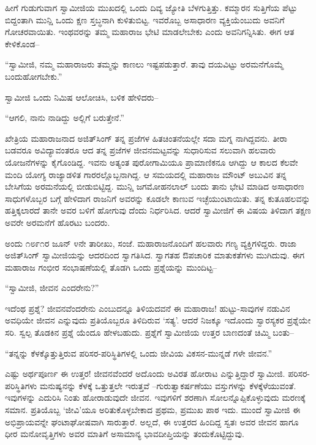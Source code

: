 ಹೀಗೆ ಗುಡುಗುವಾಗ ಸ್ವಾಮೀಜಿಯ ಮುಖದಲ್ಲಿ ಒಂದು ದಿವ್ಯ ಜ್ಯೋತಿ ಬೆಳಗುತ್ತಿತ್ತು. ಕಮ್ಮಾರನ ಸುತ್ತಿಗೆಯ ಪೆಟ್ಟು ಬಿದ್ದಂತಾಗಿ ಮುನ್ಷಿ ಒಂದು ಕ್ಷಣ ಸ್ತಬ್ಧನಾಗಿ ಕುಳಿತುಬಿಟ್ಟ. ಇವರೊಬ್ಬ ಅಸಾಧಾರಣ ವ್ಯಕ್ತಿಯೆಂಬುದು ಅವನಿಗೆ ಗೋಚರವಾಯಿತು. ಇಂಥವರನ್ನು ತಮ್ಮ ಮಹಾರಾಜ ಭೇಟಿ ಮಾಡಲೇಬೇಕು ಎಂದು ಅವನಿಗನ್ನಿಸಿತು. ಈಗ ಆತ ಕೇಳಿಕೊಂಡ–

“ಸ್ವಾಮೀಜಿ, ನಮ್ಮ ಮಹಾರಾಜರು ತಮ್ಮನ್ನು ಕಾಣಲು ಇಷ್ಟಪಡುತ್ತಾರೆ. ತಾವು ದಯವಿಟ್ಟು ಅರಮನೆಗೊಮ್ಮೆ ಬಂದುಹೋಗಬೇಕು.”

ಸ್ವಾಮೀಜಿ ಒಂದು ನಿಮಿಷ ಆಲೋಚಿಸಿ, ಬಳಿಕ ಹೇಳಿದರು–

“ಆಗಲಿ, ನಾನು ನಾಡಿದ್ದು ಅಲ್ಲಿಗೆ ಬರುತ್ತೇನೆ.”

ಖೇತ್ರಿಯ ಮಹಾರಾಜನಾದ ಅಜಿತ್​ಸಿಂಗ್ ತನ್ನ ಪ್ರಜೆಗಳ ಹಿತಚಿಂತನೆಯಲ್ಲೇ ಸದಾ ಮಗ್ನ ನಾಗಿದ್ದವನು. ತೀರಾ ಬಡವರೂ ಅವಿದ್ಯಾವಂತರೂ ಆದ ತನ್ನ ಪ್ರಜೆಗಳ ಜೀವನಮಟ್ಟವನ್ನು ಸುಧಾರಿಸುವ ಸಲುವಾಗಿ ಹಲವಾರು ಯೋಜನೆಗಳನ್ನು ಕೈಗೊಂಡಿದ್ದ. ಇವನು ಅತ್ಯಂತ ಪುರೋಗಾಮಿಯೂ ಪ್ರಾಮಾಣಿಕನೂ ಆಗಿದ್ದು ಆ ಕಾಲದ ಕೆಲವೇ ಮಂದಿ ಯೋಗ್ಯ ರಾಜ್ಯಾಡಳಿತ ಗಾರರಲ್ಲೊಬ್ಬನಾಗಿದ್ದ. ಆ ಸಮಯದಲ್ಲಿ ಮಹಾರಾಜ ಮೌಂಟ್ ಅಬುವಿನ ತನ್ನ ಬೇಸಿಗೆಯ ಅರಮನೆಯಲ್ಲಿ ಬೀಡುಬಿಟ್ಟಿದ್ದ. ಮುನ್ಷಿ ಜಗಮೋಹನಲಾಲ್ ಬಂದು ತಾನು ಭೇಟಿ ಮಾಡಿದ ಅಸಾಧಾರಣ ಸಾಧುಗಳೊಬ್ಬರ ಬಗ್ಗೆ ಹೇಳಿದಾಗ ರಾಜನಿಗೆ ಅವರನ್ನು ಕೂಡಲೇ ಕಾಣುವ ಇಚ್ಛೆಯುಂಟಾಯಿತು. ತನ್ನ ಕುತೂಹಲವನ್ನು ಹತ್ತಿಕ್ಕಲಾರದೆ ತಾನೇ ಅವರ ಬಳಿಗೆ ಹೋಗುವು ದೆಂದು ನಿರ್ಧರಿಸಿದ. ಆದರೆ ಸ್ವಾಮೀಜಿಗೆ ಈ ವಿಷಯ ತಿಳಿದಾಗ ತಕ್ಷಣ ಅವರೇ ಅರಮನೆಗೆ ಹೊರಟು ಬಂದರು.

ಅಂದು ೧೮೯೧ರ ಜೂನ್ ೪ನೇ ತಾರೀಖು, ಸಂಜೆ. ಮಹಾರಾಜನೊಂದಿಗೆ ಹಲವಾರು ಗಣ್ಯ ವ್ಯಕ್ತಿಗಳಿದ್ದರು. ರಾಜಾ ಅಜಿತ್​ಸಿಂಗ್ ಸ್ವಾಮೀಜಿಯನ್ನು ಆದರದಿಂದ ಸ್ವಾಗತಿಸಿದ. ಸ್ವಾಗತಹ ಔಪಚಾರಿಕ ಮಾತುಕತೆಗಳು ಮುಗಿದುವು. ಈಗ ಮಹಾರಾಜ ಗಂಭೀರ ಸಂಭಾಷಣೆಯಲ್ಲಿ ತೊಡಗಿ ಒಂದು ಪ್ರಶ್ನೆಯನ್ನು ಮುಂದಿಟ್ಟ–

“ಸ್ವಾಮೀಜಿ, ಜೀವನ ಎಂದರೇನು?”

ಇದೆಂಥ ಪ್ರಶ್ನೆ? ಜೀವನವೆಂದರೇನು ಎಂಬುದನ್ನೂ ತಿಳಿಯದವನೆ ಈ ಮಹಾರಾಜ! ಹುಟ್ಟು-ಸಾವುಗಳ ನಡುವಿನ ಅವಧಿಯೇ ಜೀವನ ಎನ್ನುವುದು ಪ್ರತಿಯೊಬ್ಬರೂ ತಿಳಿದಿರುವ ‘ಸತ್ಯ’. ಆದರೆ ನಿಜಕ್ಕೂ ಇದೊಂದು ಸ್ವಾರಸ್ಯಕರ ಪ್ರಶ್ನೆಯೇ ಸರಿ. ಸ್ವಲ್ಪ ತೊಡಕಿನ ಪ್ರಶ್ನೆ ಯೆಂದೂ ಹೇಳಬಹುದು. ಪ್ರಶ್ನೆಗೆ ಸ್ವಾಮೀಜಿಯ ಉತ್ತರ ಬಾಣದಂತೆ ಚಿಮ್ಮಿ ಬಂತು–

“ತನ್ನನ್ನು ಕೆಳಕ್ಕೊತ್ತುತ್ತಿರುವ ಪರಿಸರ-ಪರಿಸ್ಥಿತಿಗಳಲ್ಲಿ ಒಂದು ಜೀವಿಯ ವಿಕಸನ-ಮುನ್ನಡೆ ಗಳೇ ಜೀವನ.”

ಎಷ್ಟು ಅರ್ಥಪೂರ್ಣ ಈ ಉತ್ತರ! ಜೀವನವೆಂದರೆ ಅದೊಂದು ಅವಿರತ ಹೋರಾಟ ಎನ್ನುತ್ತಿದ್ದಾರೆ ಸ್ವಾಮೀಜಿ. ಪರಿಸರ-ಪರಿಸ್ಥಿತಿಗಳು ಮನುಷ್ಯನನ್ನು ಕೆಳಕ್ಕೆ ಒತ್ತುತ್ತಲೇ ಇರುತ್ತವೆ –ಗುರುತ್ವಾಕರ್ಷಣೆಯು ವಸ್ತುಗಳನ್ನು ಕೆಳಕ್ಕೆಳೆಯುವಂತೆ. ಇವುಗಳನ್ನು ಎದುರಿಸಿ ನಿಂತು ಹೋರಾಡುವುದೇ ಜೀವನ. ಇವುಗಳಿಗೆ ಶರಣಾಗಿ ಸೋಲನ್ನೊಪ್ಪಿಕೊಳ್ಳುವುದು ಮರಣಕ್ಕೆ ಸಮಾನ. ಪ್ರತಿಯೊಬ್ಬ ‘ಜೀವಿ’ಯೂ ಅರಿತುಕೊಳ್ಳಬೇಕಾದ ಪ್ರಥಮ, ಪ್ರಮುಖ ಪಾಠ ಇದು. ಮುಂದೆ ಸ್ವಾಮೀಜಿ ಈ ಅಭಿಪ್ರಾಯವನ್ನೇ ಘಂಟಾಘೋಷವಾಗಿ ಸಾರುತ್ತಾರೆ. ಅಲ್ಲದೆ, ಈ ಉತ್ತರದ ಹಿಂದಿದ್ದ ಸ್ವತಃ ಅವರ ಜೀವನ ಹಾಗೂ ಧೀರ ಮನೋವೃತ್ತಿಗಳು ಅವರ ಮಾತಿಗೆ ಅಸಾಮಾನ್ಯ ಭಾವದೀಪ್ತಿಯನ್ನು ತಂದುಕೊಟ್ಟಿದ್ದುವು.

